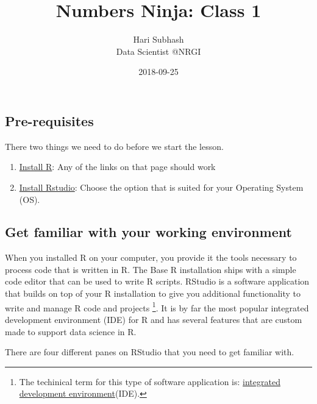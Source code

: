\documentclass[]{article}
\title{Numbers Ninja: Class 1}
\author{Hari Subhash\\
Data Scientist @NRGI}
\date{2018-09-25}
\providecommand{\tightlist}{%
  \setlength{\itemsep}{0pt}\setlength{\parskip}{0pt}}
\let\rmarkdownfootnote\footnote%
\def\footnote{\protect\rmarkdownfootnote}
\begin{document}
\maketitle

\subsection{Pre-requisites}\label{pre-requisites}

There two things we need to do before we start the lesson.

\begin{enumerate}
\def\labelenumi{\arabic{enumi}.}
\tightlist
\item
  \href{https://cran.r-project.org/}{Install R}: Any of the links on
  that page should work
\item
  \href{https://www.rstudio.com/products/rstudio/download/}{Install
  Rstudio}: Choose the option that is suited for your Operating System
  (OS).
\end{enumerate}

\subsection{Get familiar with your working
environment}\label{get-familiar-with-your-working-environment}

When you installed R on your computer, you provide it the tools
necessary to process code that is written in R. The Base R installation
ships with a simple code editor that can be used to write R scripts.
RStudio is a software application that builds on top of your R
installation to give you additional functionality to write and manage R
code and projects \footnote{The techinical term for this type of
  software application is:
  \href{https://en.wikipedia.org/wiki/Integrated_development_environment}{integrated
  development environment}(IDE).}. It is by far the most popular
integrated development environment (IDE) for R and has several features
that are custom made to support data science in R.

There are four different panes on RStudio that you need to get familiar
with.
\end{document}
